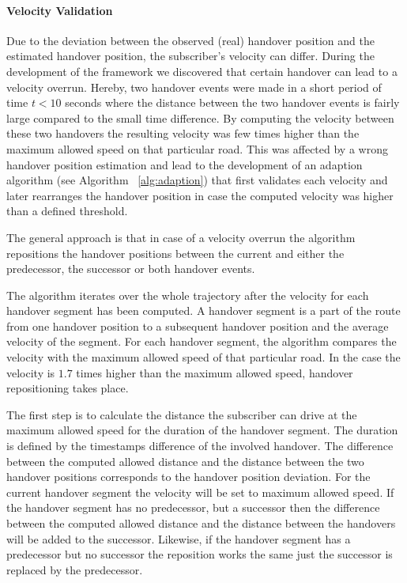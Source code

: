 \documentclass[twocolumn]{bmcart}%
\begin{document}
\paragraph{Velocity Validation}
Due to the deviation between the observed (real) handover position and the estimated handover position, the subscriber's velocity can differ. During the development of the framework we discovered that certain handover can lead to a velocity overrun. Hereby, two handover events were made in a short period of time $t<10$ seconds where the distance between the two handover events is fairly large compared to the small time difference. By computing the velocity between these two handovers the resulting velocity was few times higher than the maximum allowed speed on that particular road. This was affected by a wrong handover position estimation and lead to the development of an adaption algorithm (see Algorithm ~\ref{alg:adaption}) that first validates each velocity and later rearranges the handover position in case the computed velocity was higher than a defined threshold. 

The general approach is that in case of a velocity overrun the algorithm repositions the handover positions between the current and either the predecessor, the successor or both handover events.

The algorithm iterates over the whole trajectory after the velocity for each handover segment has been computed. A handover segment is a part of the route from one handover position to a subsequent handover position and the average velocity of the segment. For each handover segment, the algorithm compares the velocity with the maximum allowed speed of that particular road. In the case the velocity is $1.7$ times higher than the maximum allowed speed, handover repositioning takes place. 

The first step is to calculate the distance the subscriber can drive at the maximum allowed speed for the duration of the handover segment. The duration is defined by the timestamps difference of the involved handover. The difference between the computed allowed distance and the distance between the two handover positions corresponds to the handover position deviation. For the current handover segment the velocity will be set to maximum allowed speed. If the handover segment has no predecessor, but a successor then the difference between the computed allowed distance and the distance between the handovers will be added to the successor. Likewise, if the handover segment has a predecessor but no successor the reposition works the same just the successor is replaced by the predecessor. 
\end{document}
